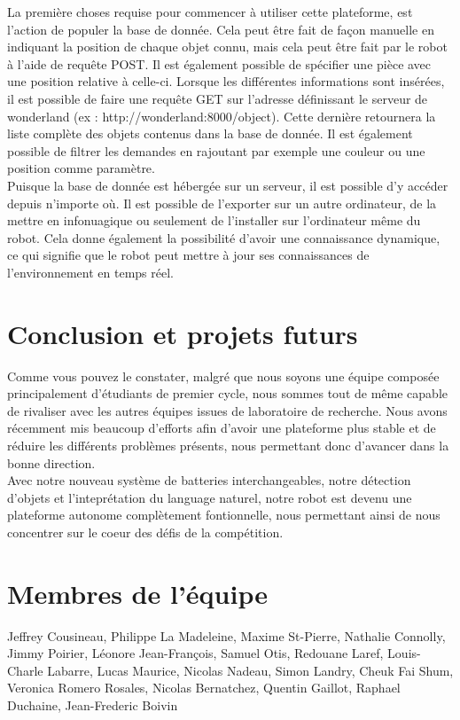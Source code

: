 \documentclass[runningheads,a4paper]{llncs}
\begin{document}
La première choses requise pour commencer à utiliser cette plateforme, est l'action de populer la base de donnée. Cela peut être fait de façon manuelle en indiquant la position de chaque objet connu, mais cela peut être fait par le robot à l'aide de requête POST. Il est également possible de spécifier une pièce avec une position relative à celle-ci. Lorsque les différentes informations sont insérées, il est possible de faire une requête GET sur l'adresse définissant le serveur de wonderland (ex : http://wonderland:8000/object). Cette dernière retournera la liste complète des objets contenus dans la base de donnée. Il est également possible de filtrer les demandes en rajoutant par exemple une couleur ou une position comme paramètre. \\

Puisque la base de donnée est hébergée sur un serveur, il est possible d'y accéder depuis n'importe où. Il est possible de l'exporter sur un autre ordinateur, de la mettre en infonuagique ou seulement de l'installer sur l'ordinateur même du robot. Cela donne également la possibilité d'avoir une connaissance dynamique, ce qui signifie que le robot peut mettre à jour ses connaissances de l'environnement en temps réel.\\



\section{Conclusion et projets futurs} 
Comme vous pouvez le constater, malgré que nous soyons une équipe composée principalement d'étudiants de premier cycle, nous sommes tout de même capable de rivaliser avec les autres équipes issues de laboratoire de recherche. Nous avons récemment mis beaucoup d'efforts afin d'avoir une plateforme plus stable et de réduire les différents problèmes présents, nous permettant donc d'avancer dans la bonne direction. \\

Avec notre nouveau système de batteries interchangeables, notre détection d'objets et l'inteprétation du language naturel, notre robot est devenu une plateforme autonome complètement fontionnelle, nous permettant ainsi de nous concentrer sur le coeur des défis de la compétition.\\


	

\section*{Membres de l'équipe}
Jeffrey Cousineau, Philippe La Madeleine, Maxime St-Pierre, Nathalie Connolly, Jimmy Poirier, Léonore Jean-François, Samuel Otis, Redouane Laref, Louis-Charle Labarre, Lucas Maurice, Nicolas Nadeau, Simon Landry, Cheuk Fai Shum, Veronica Romero Rosales, Nicolas Bernatchez, Quentin Gaillot, Raphael Duchaine, Jean-Frederic Boivin 

\nocite{*}


\end{document}
